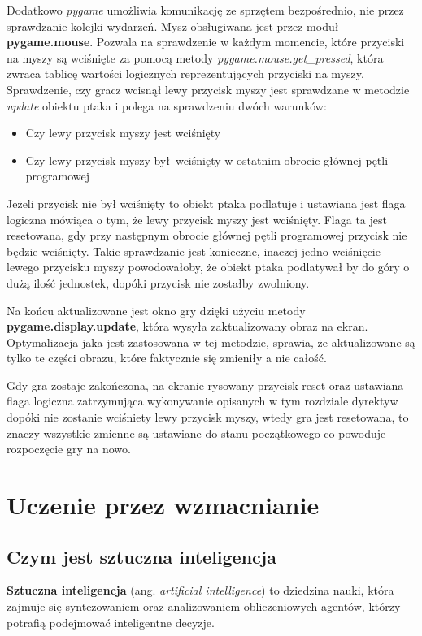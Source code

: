 \documentclass[a4paper,12pt,oneside]{book}
\begin{document}
Dodatkowo \textit{pygame} umożliwia komunikację ze sprzętem bezpośrednio, nie
przez sprawdzanie kolejki wydarzeń. Mysz obsługiwana jest przez moduł
\textbf{pygame.mouse}. Pozwala na sprawdzenie w każdym momencie, które
przyciski na myszy są wciśnięte za pomocą metody
\textit{pygame.mouse.get\_pressed}, która zwraca tablicę wartości logicznych
reprezentujących przyciski na myszy.
Sprawdzenie, czy gracz wcisnął lewy przycisk myszy jest sprawdzane w metodzie
\textit{update} obiektu ptaka i polega na sprawdzeniu dwóch warunków:
\begin{itemize}
	\item Czy lewy przycisk myszy jest wciśnięty
	\item Czy lewy przycisk myszy był wciśnięty w ostatnim obrocie głównej
		pętli programowej
\end{itemize}
Jeżeli przycisk nie był wciśnięty to obiekt ptaka podlatuje i ustawiana jest
flaga logiczna mówiąca o tym, że lewy przycisk myszy jest wciśnięty. Flaga
ta jest resetowana, gdy przy następnym obrocie głównej pętli programowej
przycisk nie będzie wciśnięty. Takie sprawdzanie jest konieczne, inaczej jedno
wciśnięcie lewego przycisku myszy powodowałoby, że obiekt ptaka podlatywał by
do góry o dużą ilość jednostek, dopóki przycisk nie zostałby zwolniony.

Na końcu aktualizowane jest okno gry dzięki użyciu metody
\textbf{pygame.display.update}, która wysyła zaktualizowany obraz na ekran.
Optymalizacja jaka jest zastosowana w tej metodzie, sprawia, że aktualizowane
są tylko te części obrazu, które faktycznie się zmieniły a nie całość.

Gdy gra zostaje zakończona, na ekranie rysowany przycisk reset oraz ustawiana
flaga logiczna zatrzymująca wykonywanie opisanych w tym rozdziale dyrektyw
dopóki nie zostanie wciśniety lewy przycisk myszy, wtedy gra jest resetowana,
to znaczy wszystkie zmienne są ustawiane do stanu początkowego co powoduje
rozpoczęcie gry na nowo.

\chapter{Uczenie przez wzmacnianie}
\section{Czym jest sztuczna inteligencja}
\textbf{Sztuczna inteligencja} (ang. \textit{artificial intelligence}) to
dziedzina nauki, która zajmuje się syntezowaniem oraz analizowaniem
obliczeniowych agentów, którzy potrafią podejmować inteligentne decyzje.
\end{document}
